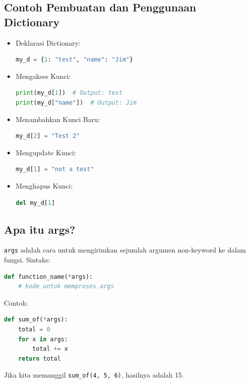 \documentclass{article}
\begin{document}
\subsection{Contoh Pembuatan dan Penggunaan Dictionary}
\begin{itemize}
    \item Deklarasi Dictionary:
          \begin{lstlisting}[language=Python, caption={}, captionpos=b]
my_d = {1: "test", "name": "Jim"}
\end{lstlisting}
    \item Mengakses Kunci:
          \begin{lstlisting}[language=Python, caption={}, captionpos=b]
print(my_d[1])  # Output: test
print(my_d["name"])  # Output: Jim
\end{lstlisting}
    \item Menambahkan Kunci Baru:
          \begin{lstlisting}[language=Python, caption={}, captionpos=b]
my_d[2] = "Test 2"
\end{lstlisting}
    \item Mengupdate Kunci:
          \begin{lstlisting}[language=Python, caption={}, captionpos=b]
my_d[1] = "not a test"
\end{lstlisting}
    \item Menghapus Kunci:
          \begin{lstlisting}[language=Python, caption={}, captionpos=b]
del my_d[1]
\end{lstlisting}
\end{itemize}

\subsection{Apa itu args?}
\verb|args| adalah cara untuk mengirimkan sejumlah argumen non-keyword ke dalam fungsi.
Sintaks:
\begin{lstlisting}[language=Python, caption={}, captionpos=b]
def function_name(*args):
    # kode untuk memproses args
\end{lstlisting}
Contoh:
\begin{lstlisting}[language=Python, caption={}, captionpos=b]
def sum_of(*args):
    total = 0
    for x in args:
        total += x
    return total
\end{lstlisting}
Jika kita memanggil \verb|sum_of(4, 5, 6)|, hasilnya adalah 15.
\end{document}
